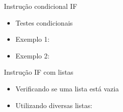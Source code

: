 \begin{frame}{Instrução condicional IF}
  \begin{itemize}
    \item Testes condicionais
      
    \item Exemplo 1:
      
    \item Exemplo 2:
      
  \end{itemize}  
\end{frame}
%
\begin{frame}{Instrução IF com listas}
  \begin{itemize}
    \item Verificando se uma lista está vazia
      
      \pagebreak
    \item Utilizando diversas listas:
      
  \end{itemize}  
\end{frame}
%




 